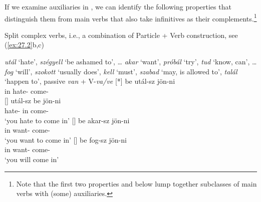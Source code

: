 \documentclass[output=paper]{langsci/langscibook}
\begin{document}
If we examine auxiliaries in , we can identify the following
properties that distinguish them from main verbs that also take infinitives as
their complements.\footnote{Note that the first two properties 
    and  below lump together subclasses of main verbs with (some)
auxiliaries.}

\begin{exe}\label{ex:27.2}
    \ex Split complex verbs, i.e., a combination of Particle + Verb
    construction, see (\ref{ex:27.2}b,c)\footnotemark
    \begin{xlist}
     \emph{utál} ‘hate’, \emph{szégyell} ‘be ashamed to’, \dots{}
     \emph{akar} ‘want’, \emph{próbál} ‘try’, \emph{tud} ‘know, can’,
        \dots{}
     \emph{fog} ‘will’, \emph{szokott} ‘usually does’, \emph{kell}
        ‘must’, \emph{szabad} ‘may, is allowed to’, \emph{talál} ‘happen to’,
        passive \emph{van} + V-\emph{va/ve}
    [*]{%
        \gll    be   utál-sz     jön-ni \\
                in    hate-\Ssg{}  come-\Inf{}\\}
    []{%
        \gll    utál-sz    be jön-ni \\
                hate-\Ssg{}  in   come-\Inf{}\\
        \glt    ‘you hate to come in’}
    []{%
        \gll    be   akar-sz     jön-ni\\
                in    want-\Ssg{}  come-\Inf{}\\
        \glt    ‘you want to come in’}
    []{%
        \gll    be   fog-sz    jön-ni\\
                in    want-\Ssg{}  come-\Inf{}\\
        \glt    ‘you will come in’}
    \end{xlist}
\end{exe}
\end{document}

